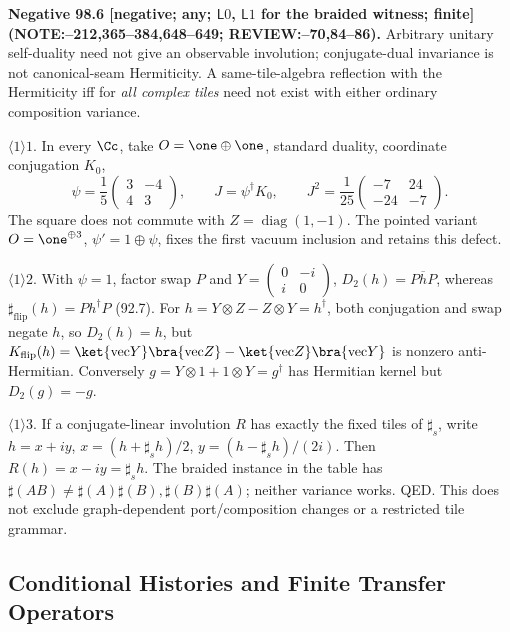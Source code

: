 \textbf{Negative 98.6 [negative; any; \(\mathsf L0\), \(\mathsf L1\) for the braided witness; finite] (NOTE:--212,365--384,648--649; REVIEW:--70,84--86).}
Arbitrary unitary self-duality need not give an observable involution; conjugate-dual invariance is not
canonical-seam Hermiticity. A same-tile-algebra reflection with the Hermiticity iff for \emph{all complex tiles}
need not exist with either ordinary composition variance.
\par\(\langle1\rangle1\). In every \(\Cc\), take \(O=\one\oplus\one\), standard duality, coordinate conjugation \(K_0\),
\[
 \psi=\frac15\begin{pmatrix}3&-4\\4&3\end{pmatrix},\qquad
 J=\psi^\dagger K_0,\qquad J^2=\frac1{25}\begin{pmatrix}-7&24\\-24&-7\end{pmatrix}.
\]
The square does not commute with \(Z=\operatorname{diag}(1,-1)\). The pointed variant
\(O=\one^{\oplus3}\), \(\psi'=1\oplus\psi\), fixes the first vacuum inclusion and retains this defect.
\par\(\langle1\rangle2\). With \(\psi=1\), factor swap \(P\) and \(Y=\left(\begin{smallmatrix}0&-i\\i&0\end{smallmatrix}\right)\),
\(D_2(h)=P\overline hP\), whereas \(\sharp_{\mathrm{flip}}(h)=Ph^\dagger P\) (92.7).
For \(h=Y\otimes Z-Z\otimes Y=h^\dagger\), both conjugation and swap negate \(h\), so \(D_2(h)=h\), but
\(K_{\mathrm{flip}}(h)=\ket{\mathrm{vec}Y}\bra{\mathrm{vec}Z}-\ket{\mathrm{vec}Z}\bra{\mathrm{vec}Y}\)
is nonzero anti-Hermitian. Conversely \(g=Y\otimes1+1\otimes Y=g^\dagger\) has Hermitian kernel but \(D_2(g)=-g\).
\par\(\langle1\rangle3\). If a conjugate-linear involution \(R\) has exactly the fixed tiles of \(\sharp_s\), write
\(h=x+iy\), \(x=(h+\sharp_s h)/2\), \(y=(h-\sharp_s h)/(2i)\). Then \(R(h)=x-iy=\sharp_s h\).
The braided instance in the table has \(\sharp(AB)\ne\sharp(A)\sharp(B),\sharp(B)\sharp(A)\); neither variance works.
QED. This does not exclude graph-dependent port/composition changes or a restricted tile grammar.

\subsection{Conditional Histories and Finite Transfer Operators}

